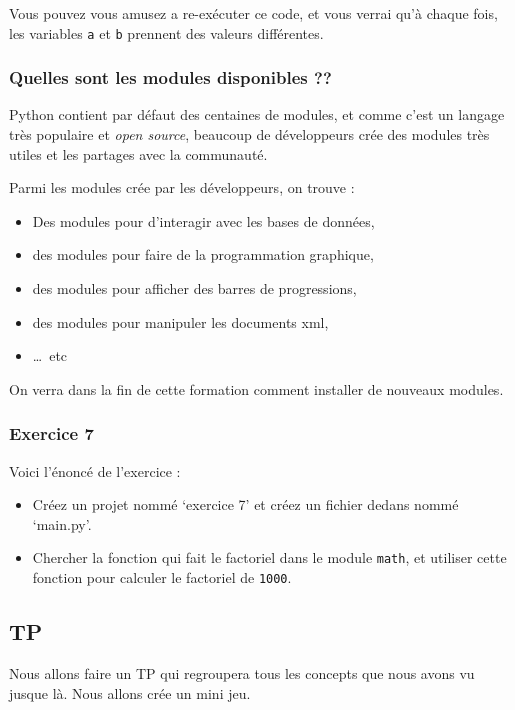 \documentclass[12pt]{article}
\newcommand{\code}[1]{\colorbox{light-gray}{\texttt{#1}}}
\begin{document}
            Vous pouvez vous amusez a re-exécuter ce code, et vous verrai qu'à chaque fois, les variables \code{a} et 
            \code{b} prennent des valeurs différentes.

        \subsubsection{Quelles sont les modules disponibles ??}
            Python contient par défaut des centaines de modules, et comme c'est un langage très populaire et 
            \emph{open source}, beaucoup de développeurs crée des modules très utiles et les partages avec la communauté.

            Parmi les modules crée par les développeurs, on trouve :
            \begin{itemize}
                \item Des modules pour d’interagir avec les bases de données, 
                \item des modules pour faire de la programmation graphique, 
                \item des modules pour afficher des barres de progressions, 
                \item des modules pour manipuler les documents xml,
                \item \dots\ etc
            \end{itemize}

            On verra dans la fin de cette formation comment installer de nouveaux modules.

        \subsubsection{Exercice 7}
            Voici l'énoncé de l'exercice :
            \begin{itemize}
                \item Créez un projet nommé `exercice 7' et créez un fichier dedans nommé `main.py'.
                \item Chercher la fonction qui fait le factoriel dans le module \code{math}, et utiliser cette fonction
                    pour calculer le factoriel de \code{1000}.
            \end{itemize}
    \subsection{TP}
        Nous allons faire un TP qui regroupera tous les concepts que nous avons vu jusque là. Nous allons crée un 
        mini jeu. 
\end{document}
